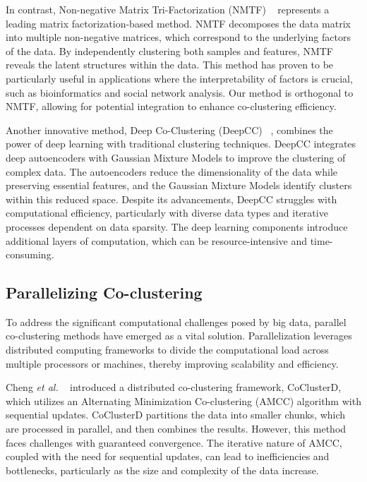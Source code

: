 \documentclass[journal]{IEEEtran}
\renewcommand{\cite}[1]{~\autocite{#1}}
\begin{document}
In contrast, Non-negative Matrix Tri-Factorization (NMTF) \cite{long2005CoclusteringBlockValue} represents a leading matrix factorization-based method. NMTF decomposes the data matrix into multiple non-negative matrices, which correspond to the underlying factors of the data. By independently clustering both samples and features, NMTF reveals the latent structures within the data. This method has proven to be particularly useful in applications where the interpretability of factors is crucial, such as bioinformatics and social network analysis. Our method is orthogonal to NMTF, allowing for potential integration to enhance co-clustering efficiency.

Another innovative method, Deep Co-Clustering (DeepCC) \cite{dongkuanxu2019DeepCoClustering}, combines the power of deep learning with traditional clustering techniques. DeepCC integrates deep autoencoders with Gaussian Mixture Models to improve the clustering of complex data. The autoencoders reduce the dimensionality of the data while preserving essential features, and the Gaussian Mixture Models identify clusters within this reduced space. Despite its advancements, DeepCC struggles with computational efficiency, particularly with diverse data types and iterative processes dependent on data sparsity. The deep learning components introduce additional layers of computation, which can be resource-intensive and time-consuming.

\subsection{Parallelizing Co-clustering}

To address the significant computational challenges posed by big data, parallel co-clustering methods have emerged as a vital solution. Parallelization leverages distributed computing frameworks to divide the computational load across multiple processors or machines, thereby improving scalability and efficiency.

Cheng \textit{et al.} \cite{cheng2015CoClusterDDistributedFramework} introduced a distributed co-clustering framework, CoClusterD, which utilizes an Alternating Minimization Co-clustering (AMCC) algorithm with sequential updates. CoClusterD partitions the data into smaller chunks, which are processed in parallel, and then combines the results. However, this method faces challenges with guaranteed convergence. The iterative nature of AMCC, coupled with the need for sequential updates, can lead to inefficiencies and bottlenecks, particularly as the size and complexity of the data increase.
\end{document}
